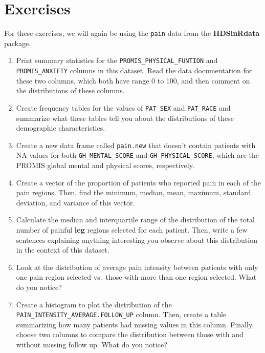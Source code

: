 \documentclass[
  letterpaper,
]{krantz}
\makeatletter
\newenvironment{Shaded}{\begin{snugshade}}{\end{snugshade}}
\newcommand{\CommentTok}[1]{\textcolor[rgb]{0.37,0.37,0.37}{#1}}
\newcommand{\DecValTok}[1]{\textcolor[rgb]{0.68,0.00,0.00}{#1}}
\newcommand{\FunctionTok}[1]{\textcolor[rgb]{0.28,0.35,0.67}{#1}}
\newcommand{\NormalTok}[1]{\textcolor[rgb]{0.00,0.23,0.31}{#1}}
\newcommand{\OtherTok}[1]{\textcolor[rgb]{0.00,0.23,0.31}{#1}}
\newcommand{\SpecialCharTok}[1]{\textcolor[rgb]{0.37,0.37,0.37}{#1}}
\newcommand{\StringTok}[1]{\textcolor[rgb]{0.13,0.47,0.30}{#1}}
\newenvironment{kframe}{%
\medskip{}
\setlength{\fboxsep}{.8em}
 \def\at@end@of@kframe{}%
 \ifinner\ifhmode%
  \def\at@end@of@kframe{\end{minipage}}%
  \begin{minipage}{\columnwidth}%
 \fi\fi%
 \def\FrameCommand##1{\hskip\@totalleftmargin \hskip-\fboxsep
 \colorbox{shadecolor}{##1}\hskip-\fboxsep
     \hskip-\linewidth \hskip-\@totalleftmargin \hskip\columnwidth}%
 \MakeFramed {\advance\hsize-\width
   \@totalleftmargin\z@ \linewidth\hsize
   \@setminipage}}%
 {\par\unskip\endMakeFramed%
 \at@end@of@kframe}
\renewenvironment{Shaded}{\begin{kframe}}{\end{kframe}}
\makeatother
\begin{document}
\begin{Shaded}
\end{Shaded}

\hypertarget{exercises-1}{%
\section{Exercises}\label{exercises-1}}

For these exercises, we will again be using the \texttt{pain} data from
the \textbf{HDSinRdata} package.

\begin{enumerate}
\def\labelenumi{\arabic{enumi}.}
\item
  Print summary statistics for the \texttt{PROMIS\_PHYSICAL\_FUNTION}
  and \texttt{PROMIS\_ANXIETY} columns in this dataset. Read the data
  documentation for these two columns, which both have range 0 to 100,
  and then comment on the distributions of these columns.
\item
  Create frequency tables for the values of \texttt{PAT\_SEX} and
  \texttt{PAT\_RACE} and summarize what these tables tell you about the
  distributions of these demographic characteristics.
\item
  Create a new data frame called \texttt{pain.new} that doesn't contain
  patients with NA values for both \texttt{GH\_MENTAL\_SCORE} and
  \texttt{GH\_PHYSICAL\_SCORE}, which are the PROMIS global mental and
  physical scores, respectively.
\item
  Create a vector of the proportion of patients who reported pain in
  each of the pain regions. Then, find the minimum, median, mean,
  maximum, standard deviation, and variance of this vector.
\item
  Calculate the median and interquartile range of the distribution of
  the total number of painful \textbf{leg} regions selected for each
  patient. Then, write a few sentences explaining anything interesting
  you observe about this distribution in the context of this dataset.
\item
  Look at the distribution of average pain intensity between patients
  with only one pain region selected vs.~those with more than one region
  selected. What do you notice?
\item
  Create a histogram to plot the distribution of the
  \texttt{PAIN\_INTENSITY\_AVERAGE.FOLLOW\_UP} column. Then, create a
  table summarizing how many patients had missing values in this column.
  Finally, choose two columns to compare the distribution between those
  with and without missing follow up. What do you notice?
\end{enumerate}
\end{document}
